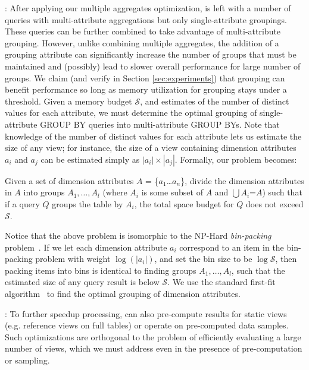 :
 After applying our multiple aggregates optimization, \SeeDB is left with a number of 
queries with multi-attribute aggregations but only single-attribute groupings.
These queries can be further combined to take advantage of multi-attribute grouping.
However, unlike combining multiple aggregates, the addition of a grouping attribute can 
significantly increase the number of groups that must be maintained and (possibly)
lead to slower overall performance for large number of groups.
We claim (and verify in Section \ref{sec:experiments}) that grouping can benefit 
performance so long as memory utilization for grouping stays under a threshold. 
Given a memory budget $\mathcal{S}$,
and estimates of the number of distinct values for each attribute, we must determine the 
optimal grouping of single-attribute GROUP BY queries into multi-attribute GROUP BYs.
Note that knowledge of the number of distinct values for each attribute lets us estimate the
size of any view; for instance, the size of a view containing dimension attributes $a_i$ and $a_j$ 
can be estimated simply as $|a_i|\times |a_j|$.
Formally, our problem becomes:
\vspace{-5pt}
\begin{problem}
Given a set of dimension attributes $A$ = \{$a_1$\ldots$a_n$\}, divide the
dimension attributes in $A$ into groups $A_1, \ldots, A_l$ (where $A_i$ is some
subset of $A$ and $\bigcup A_i$=$A$) such that if a query $Q$ groups the table by $A_i$, 
the total space budget for $Q$ does not exceed $\mathcal{S}$.
\vspace{-5pt}
\end{problem}

Notice that the above problem is isomorphic to the NP-Hard {\em bin-packing} problem~\cite{garey}.
If we let each dimension attribute
$a_i$ correspond to an item in the bin-packing problem with weight $\log (|a_i|)$,
and set the bin size to be $\log \mathcal{S}$,
then packing items into bins is identical to finding groups $A_1, \ldots, A_l$,
such that the estimated size of any query result is below $\mathcal{S}$.
We use the standard first-fit algorithm~\cite{first-fit} to find the optimal
grouping of dimension attributes.

: 
To further speedup processing, \SeeDB can also pre-compute results for 
static views (e.g. reference views on full tables) or operate on
pre-computed data samples.  Such optimizations are orthogonal to the
problem of efficiently evaluating a large number of views, which we must address
even in the presence of pre-computation or sampling.